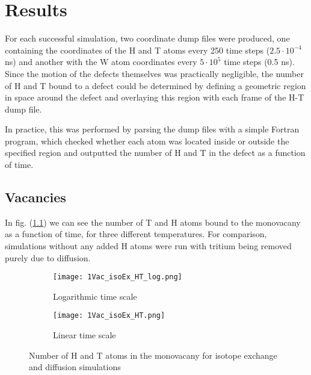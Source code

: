 \chapter{Results}
For each successful simulation, two coordinate dump files were produced, one containing the coordinates of the H and T atoms every 250 time steps ($2.5\cdot 10^{-4}$ ns) and another with the W atom coordinates every $5\cdot 10^5$ time steps (0.5 ns).
Since the motion of the defects themselves was practically negligible, the number of H and T bound to a defect could be determined by defining a geometric region in space around the defect and overlaying this region with each frame of the H-T dump file.

In practice, this was performed by parsing the dump files with a simple Fortran program, which checked whether each atom was located inside or outside the specified region and outputted the number of H and T in the defect as a function of time.


\section{Vacancies}
In fig. (\ref{Fig:1Vac_results}) we can see the number of T and H atoms bound to the monovacany as a function of time, for three different temperatures. 
For comparison, simulations without any added H atoms were run with tritium being removed purely due to diffusion. 

\begin{figure}[ht]
\begin{subfigure}{.5\textwidth}
  \centering
  \texttt{[image: 1Vac\_isoEx\_HT\_log.png]}  
  \caption{Logarithmic time scale}
\end{subfigure}
\begin{subfigure}{.5\textwidth}
  \centering
  \texttt{[image: 1Vac\_isoEx\_HT.png]}  
  \caption{Linear time scale}
\end{subfigure}
\caption{Number of H and T atoms in the monovacany for isotope exchange and diffusion simulations}
 \label{Fig:1Vac_results} 
\end{figure}


